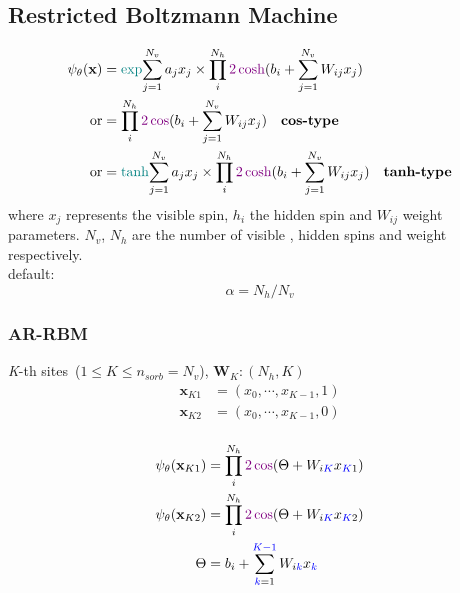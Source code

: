 \subsection{Restricted Boltzmann Machine}
\begin{equation}
    \begin{split}
    \psi_{\theta}(\mathbf{x}) & = \textcolor{teal}{\exp}{\sum_{j=1}^{N_v}a_jx_j} \times 
        \prod_i^{N_h}\textcolor{violet}{2\cosh}(b_i + \sum_{j=1}^{N_v}W_{ij}x_j) \\
        \text{or} & = \prod_i^{N_h}\textcolor{violet}{2\cos}(b_i + \sum_{j=1}^{N_v}W_{ij}x_j) \quad 
        \textbf{cos-type}\\
        \text{or} & = \textcolor{teal}{\tanh}{\sum_{j=1}^{N_v}a_jx_j} \times 
        \prod_i^{N_h}\textcolor{violet}{2\cosh}(b_i + \sum_{j=1}^{N_v}W_{ij}x_j) \quad
        \textbf{tanh-type}
    \end{split}
\end{equation}
where $x_j$ represents the visible spin, $h_i$ the hidden spin and $W_{ij}$ weight parameters.
$N_v$, $N_h$ are the number of visible , hidden spins and weight respectively.\\
default:
\begin{equation}
    \alpha = N_h/N_v
\end{equation}

\subsubsection{AR-RBM}
\textit{K}-th sites\ ($1 \leq K \leq n_{sorb}=N_v$), $\mathbf{W}_K : (N_h, K)$\cite{bortone2023impact}
\begin{equation}
    \begin{split}
    \mathbf{x}_{K1} & = (x_0, \cdots, x_{K-1}, 1) \\
    \mathbf{x}_{K2} & = (x_0, \cdots, x_{K-1}, 0) \\
    \end{split}
\end{equation}

\begin{equation}
    \begin{split}
    \psi_{\theta}(\mathbf{x}_{K1}) & = \prod_{i}^{N_h}\textcolor{violet}{2\cos}
        (\Theta +W_{i\textcolor{blue}{K}}x_{\textcolor{blue}{K}1}) \\
    \psi_{\theta}(\mathbf{x}_{K2}) & = \prod_{i}^{N_h}\textcolor{violet}{2\cos}
        (\Theta +W_{i\textcolor{blue}{K}}x_{\textcolor{blue}{K}2})\\
    \Theta & = b_i + \sum_{\textcolor{blue}{k}=1}^{\textcolor{blue}{K-1}}W_{i\textcolor{blue}{k}}x_{\textcolor{blue}{k}} \\
    \end{split}
\end{equation}

